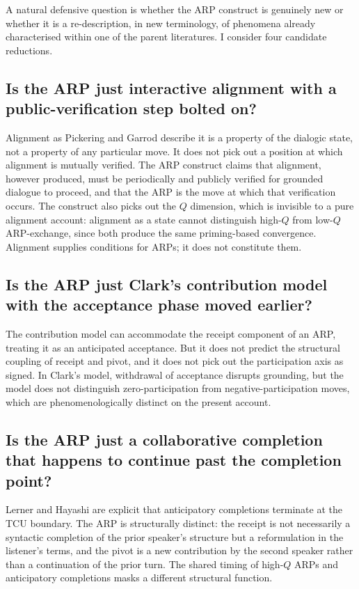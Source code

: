 A natural defensive question is whether the ARP construct is genuinely new or whether it is a re-description, in new terminology, of phenomena already characterised within one of the parent literatures. I consider four candidate reductions.

\subsection{Is the ARP just interactive alignment with a public-verification step bolted on?}

Alignment as Pickering and Garrod describe it is a property of the dialogic state, not a property of any particular move. It does not pick out a position at which alignment is mutually verified. The ARP construct claims that alignment, however produced, must be periodically and publicly verified for grounded dialogue to proceed, and that the ARP is the move at which that verification occurs. The construct also picks out the $Q$ dimension, which is invisible to a pure alignment account: alignment as a state cannot distinguish high-$Q$ from low-$Q$ ARP-exchange, since both produce the same priming-based convergence. Alignment supplies conditions for ARPs; it does not constitute them.

\subsection{Is the ARP just Clark's contribution model with the acceptance phase moved earlier?}

The contribution model can accommodate the receipt component of an ARP, treating it as an anticipated acceptance. But it does not predict the structural coupling of receipt and pivot, and it does not pick out the participation axis as signed. In Clark's model, withdrawal of acceptance disrupts grounding, but the model does not distinguish zero-participation from negative-participation moves, which are phenomenologically distinct on the present account.

\subsection{Is the ARP just a collaborative completion that happens to continue past the completion point?}

Lerner and Hayashi are explicit that anticipatory completions terminate at the TCU boundary. The ARP is structurally distinct: the receipt is not necessarily a syntactic completion of the prior speaker's structure but a reformulation in the listener's terms, and the pivot is a new contribution by the second speaker rather than a continuation of the prior turn. The shared timing of high-$Q$ ARPs and anticipatory completions masks a different structural function.

